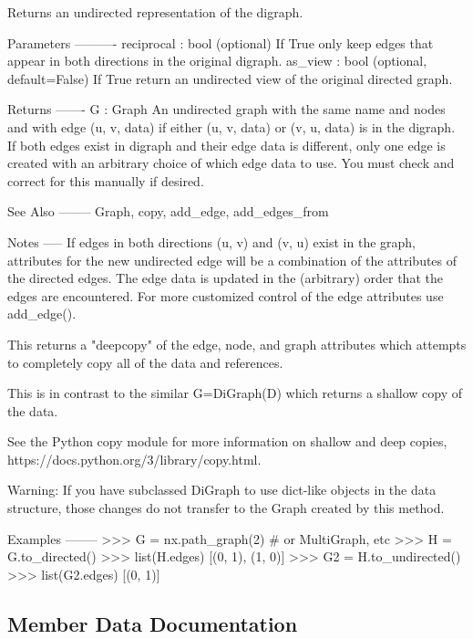 \begin{DoxyVerb}Returns an undirected representation of the digraph.

Parameters
----------
reciprocal : bool (optional)
  If True only keep edges that appear in both directions
  in the original digraph.
as_view : bool (optional, default=False)
  If True return an undirected view of the original directed graph.

Returns
-------
G : Graph
    An undirected graph with the same name and nodes and
    with edge (u, v, data) if either (u, v, data) or (v, u, data)
    is in the digraph.  If both edges exist in digraph and
    their edge data is different, only one edge is created
    with an arbitrary choice of which edge data to use.
    You must check and correct for this manually if desired.

See Also
--------
Graph, copy, add_edge, add_edges_from

Notes
-----
If edges in both directions (u, v) and (v, u) exist in the
graph, attributes for the new undirected edge will be a combination of
the attributes of the directed edges.  The edge data is updated
in the (arbitrary) order that the edges are encountered.  For
more customized control of the edge attributes use add_edge().

This returns a "deepcopy" of the edge, node, and
graph attributes which attempts to completely copy
all of the data and references.

This is in contrast to the similar G=DiGraph(D) which returns a
shallow copy of the data.

See the Python copy module for more information on shallow
and deep copies, https://docs.python.org/3/library/copy.html.

Warning: If you have subclassed DiGraph to use dict-like objects
in the data structure, those changes do not transfer to the
Graph created by this method.

Examples
--------
>>> G = nx.path_graph(2)  # or MultiGraph, etc
>>> H = G.to_directed()
>>> list(H.edges)
[(0, 1), (1, 0)]
>>> G2 = H.to_undirected()
>>> list(G2.edges)
[(0, 1)]
\end{DoxyVerb}
 

\subsection{Member Data Documentation}
\mbox{\label{classnetworkx_1_1classes_1_1digraph_1_1DiGraph_aa7fd727d37c7f284c8065aa46e734b11}} 
